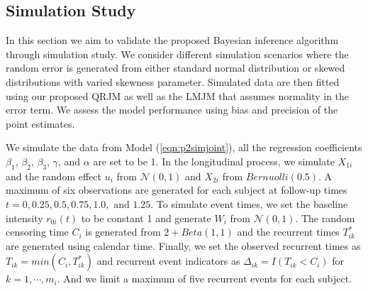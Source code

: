 







% 

\subsection{Simulation Study} \label{sec:p2simulation}
In this section we aim to validate the proposed Bayesian inference algorithm through simulation study. We consider different simulation scenarios where the random error is generated from either standard normal distribution or skewed distributions with varied skewness parameter. Simulated data are then fitted using our proposed QRJM as well as the LMJM that assumes normality in the error term. We assess the model performance using bias and precision of the point estimates.

We simulate the data from Model (\ref{eqn:p2simjoint}), all the regression coefficients $\beta_1$, $\beta_2$, $\beta_3$, $\gamma$, and $\alpha$ are set to be 1. In the longitudinal process, we simulate $X_{1i}$ and the random effect $u_i$ from $\mathcal{N}(0, 1)$ and $X_{2i}$ from $Bernuolli(0.5)$. A maximum of six observations are generated for each subject at follow-up times $t=0, 0.25, 0.5, 0.75, 1.0, \mbox{ and }1.25$. To simulate event times, we set the baseline intensity $r_{0i}(t)$ to be constant 1 and generate $W_i$ from $\mathcal{N}(0, 1)$. The random censoring time $C_i$ is generated from $2+Beta(1,1)$ and the recurrent times $T_{ik}^*$ are generated using calendar time. Finally, we set the observed recurrent times as $T_{ik} = min(C_i, T_{ik}^*)$ and recurrent event indicators as $\Delta_{ik} = I(T_{ik} < C_i)$ for $k=1, \cdots, m_i$. And we limit a maximum of five recurrent events for each subject.


